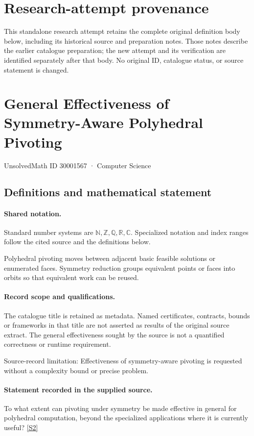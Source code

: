 \documentclass[11pt]{article}
\begin{document}
\section*{Research-attempt provenance}
This standalone research attempt retains the complete original definition body below,
including its historical source and preparation notes. Those notes describe the
earlier catalogue preparation; the new attempt and its verification are identified
separately after that body. No original ID, catalogue status, or source statement is changed.

\section{General Effectiveness of Symmetry-Aware Polyhedral Pivoting}\label{30001567}
{\small UnsolvedMath ID 30001567 · Computer Science}
\subsection{Definitions and mathematical statement}

\paragraph{Shared notation.}Standard number systems are $\mathbb N,\mathbb Z,\mathbb Q,\mathbb R,\mathbb C$. Specialized notation and index ranges follow the cited source and the definitions below.


Polyhedral pivoting moves between adjacent basic feasible solutions or enumerated faces. Symmetry reduction groups equivalent points or faces into orbits so that equivalent work can be reused.
\paragraph{Record scope and qualifications.}
The catalogue title is retained as metadata. Named certificates, contracts, bounds or frameworks in that title are not asserted as results of the original source extract.
The general effectiveness sought by the source is not a quantified correctness or runtime requirement.

Source-record limitation: Effectiveness of symmetry-aware pivoting is requested without a complexity bound or precise problem.
\paragraph{Statement recorded in the supplied source.}
To what extent can pivoting under symmetry be made effective in general for polyhedral computation, beyond the specialized applications where it is currently useful? \href{https://doi.org/10.4171/owr/2010/38}{[S2]}
\end{document}
